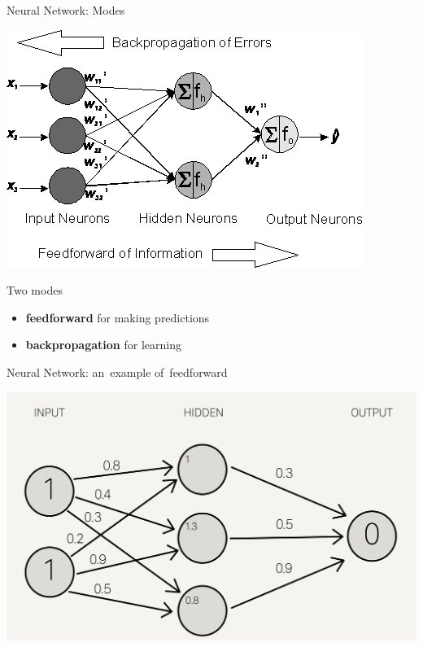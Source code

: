 \documentclass{beamer}
\begin{document}
  {
    \begin{frame}{Neural Network: Modes}
      \begin{center}
        \includegraphics[height=.6\textheight]{../img/neural_network_forward_and_backprop.png}
      \end{center}

      \pause
      Two modes
      \pause
      \begin{itemize}[<+- | alert@+>]
        \item \textbf{feedforward} for making predictions
        \item \textbf{backpropagation} for learning
      \end{itemize}
    \end{frame}
  }

  {
    \begin{frame}{Neural Network: an~example of~feedforward}
      \begin{center}
        \includegraphics[width=\textwidth]{../img/feed_forward_example.png}
      \end{center}
    \end{frame}
  }
\end{document}
